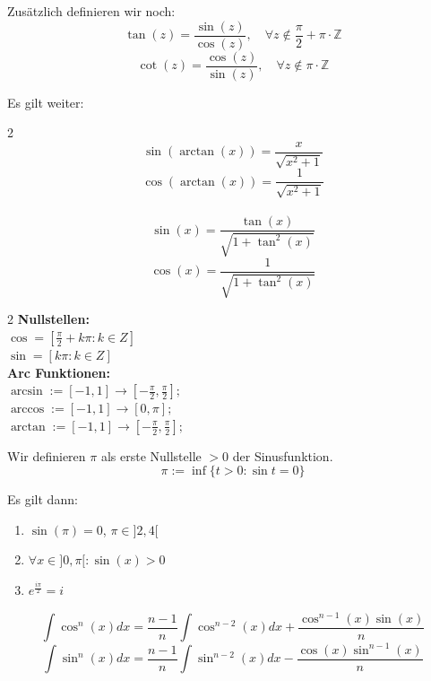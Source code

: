 Zusätzlich definieren wir noch:
$$\tan (z) = \frac{\sin(z)}{\cos(z)}, \quad \forall z \notin \frac{\pi}{2} + \pi \cdot \mathbb{Z}$$
$$\cot (z) = \frac{\cos(z)}{\sin(z)}, \quad \forall z \notin \pi \cdot \mathbb{Z}$$

Es gilt weiter:
\begin{multicols}{2}
    $$\sin(\arctan(x)) = \frac{x}{\sqrt{x^2 + 1}}$$
    $$\cos(\arctan(x)) = \frac{1}{\sqrt{x^2 + 1}}$$ \\ \columnbreak
    $$\sin(x) = \frac{\tan(x)}{\sqrt{1 + \tan^2(x)}}$$
    $$\cos(x) = \frac{1}{\sqrt{1 + \tan^2(x)}}$$  
\end{multicols}

\vspace*{2mm}
\begin{multicols}{2}
        \textbf{Nullstellen:} \\
        \(\cos = [\frac{\pi}{2}+k\pi: k \in Z]\)\\
        \(\sin = [k\pi: k \in Z]\)\\ \columnbreak
        \textbf{Arc Funktionen:} \\
        \(\arcsin:= [-1, 1 ] \to [-\frac{\pi}{2}, \frac{\pi}{2}];\)\\
        \(\arccos:= [-1, 1 ] \to [0, \pi];\)\\
        \(\arctan:= [-1, 1 ] \to [-\frac{\pi}{2}, \frac{\pi}{2}];\)\\
\end{multicols}



\begin{tcolorbox}
	Wir definieren $\pi$ als erste Nullstelle $ > 0$ der Sinusfunktion.
	$$\pi := \inf \{ t > 0 : \sin t = 0 \}$$
\end{tcolorbox}


\vfill\null
\columnbreak


Es gilt dann:
\begin{enumerate}[label = (\arabic*)]
	\item $\sin (\pi) = 0$, $\pi \in ]2,4[$
	\item $\forall x \in ]0, \pi[ : \sin (x) > 0$
	\item $e^{\frac{i \pi}{2}} = i$
\end{enumerate}


$$\int \cos^n(x)dx = \frac{n-1}{n} \int \cos^{n-2}(x)dx + \frac{\cos^{n-1}(x)\sin(x)}{n}$$
$$\int \sin^n(x)dx = \frac{n-1}{n} \int \sin^{n-2}(x)dx - \frac{\cos(x)\sin^{n-1}(x)}{n}$$


